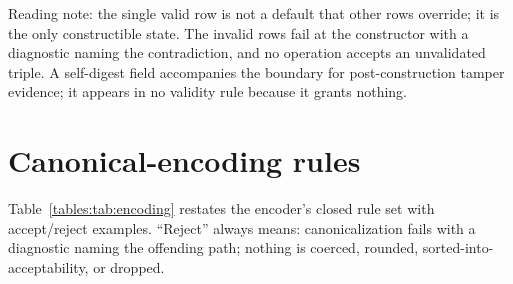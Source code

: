 Reading note: the single valid row is not a default that other rows override; it is the only constructible state. The invalid rows fail at the constructor with a diagnostic naming the contradiction, and no operation accepts an unvalidated triple. A self-digest field accompanies the boundary for post-construction tamper evidence; it appears in no validity rule because it grants nothing.

\section{Canonical-encoding rules}\label{tables:encoding}

Table~\ref{tables:tab:encoding} restates the encoder's closed rule set with accept/reject examples. ``Reject'' always means: canonicalization fails with a diagnostic naming the offending path; nothing is coerced, rounded, sorted-into-acceptability, or dropped.

